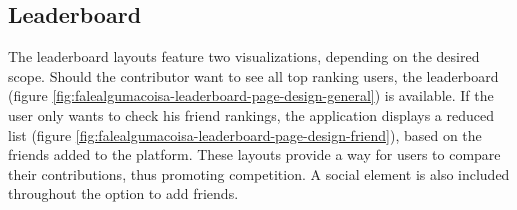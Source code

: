 \clearpage
\subsection{Leaderboard}

The leaderboard layouts feature two visualizations, depending on the desired scope. Should the contributor want to see all top ranking users, the leaderboard (figure \ref{fig:falealgumacoisa-leaderboard-page-design-general}) is available. If the user only wants to check his friend rankings, the application displays a reduced list (figure \ref{fig:falealgumacoisa-leaderboard-page-design-friend}), based on the friends added to the platform. These layouts provide a way for users to compare their contributions, thus promoting competition. A social element is also included throughout the option to add friends.

